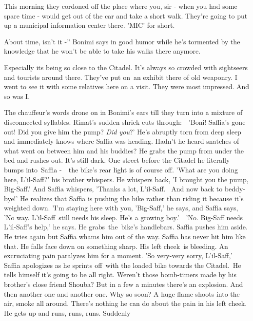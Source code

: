 \documentclass[letterpaper]{article}
\begin{document}
{\textquotedbl}This morning they cordoned off the place where you, sir - when you had some spare time - would get out of
the car and take a short walk. They're going to put up a municipal information center there. 'MIC' for
short.{\textquotedbl} 

{\textquotedbl}About time, isn't it -{}'' Bonimi says in good humor while he's tormented by the knowledge that he won't
be able to take his walks there anymore.\ \textcolor{red}{\ }

{\textquotedbl}Especially its being so close to the Citadel. It's always so crowded with sightseers and tourists around
there. They've put on~an exhibit there of old weaponry. I went to see it with some relatives here on a visit. They were
most impressed. And so was I.{\textquotedbl}\ 

The chauffeur's words drone on in Bonimi's ears till they turn into a mixture of disconnected syllables. Rimat's sudden
shriek cuts through:\ \ {}'Boni! Saffia's gone out! Did you give him the pump? \textit{Did you}?' He's abruptly torn
from deep sleep and immediately knows where Saffia was heading. Hadn't he heard snatches of what went on between him
and his buddies? He grabs the pump from under the bed and rushes out. It's still dark. One street before the Citadel he
literally bumps into~Saffia -\ \ the bike's rear light is of course off. 'What are you doing here, L'il-Saff?' his
brother whispers. He whispers back, 'I brought you the pump, Big-Saff.' And Saffia whispers, 'Thanks a lot, L'il-Saff.
~And now back to beddy-bye!{}'  He realizes that Saffia is pushing the bike rather than riding it because it's weighted
down. 'I'm staying here with you, 'Big-Saff,' he says, and Saffia says, 'No way. L'il-Saff~still needs his sleep. He's
a growing boy.'\ \ {}'No. Big-Saff needs L'il-Saff's help,' he says. He grabs~the~bike's handlebars. Saffia pushes him
aside. He tries again but Saffia whams him out of the way. Saffia has never hit him like that. He falls face down on
something sharp. His left cheek\textcolor{red}{\ }is bleeding. An excruciating pain paralyzes him for a moment. 'So
very{}-very sorry, L'il-Saff,' Saffia apologizes as he sprints off~with the loaded bike towards the Citadel.\ He tells
himself it's going to be all right. Weren't those bomb-timers made by his brother's close friend Shouba? But in a few a
minutes there's an explosion. And then another one and another one. Why so soon? A huge flame shoots into the air,
smoke all around. There's nothing he can do about the pain in his left cheek. He gets up and runs, runs, runs. Suddenly
\end{document}
